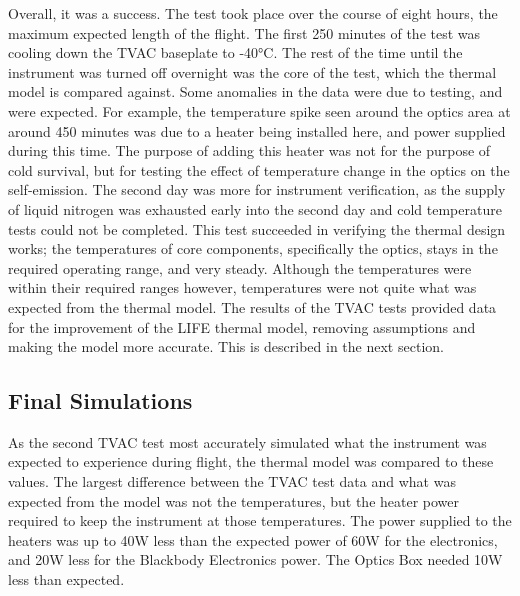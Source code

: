 Overall, it was a success. The test took place over the course of eight hours, the maximum expected length of the flight. The first 250 minutes of the test was cooling down the TVAC baseplate to -40°C. The rest of the time until the instrument was turned off overnight was the core of the test, which the thermal model is compared against. Some anomalies in the data were due to testing, and were expected. For example, the temperature spike seen around the optics area at around 450 minutes was due to a heater being installed here, and power supplied during this time. The purpose of adding this heater was not for the purpose of cold survival, but for testing the effect of temperature change in the optics on the self-emission. The second day was more for instrument verification, as the supply of liquid nitrogen was exhausted early into the second day and cold temperature tests could not be completed. This test succeeded in verifying the thermal design works; the temperatures of core components, specifically the optics, stays in the required operating range, and very steady. Although the temperatures were within their required ranges however, temperatures were not quite what was expected from the thermal model. The results of the TVAC tests provided data for the improvement of the LIFE thermal model, removing assumptions and making the model more accurate. This is described in the next section.

\subsection{Final Simulations}\label{final_pre_flight_sims}
As the second TVAC test most accurately simulated what the instrument was expected to experience during flight, the thermal model was compared to these values. The largest difference between the TVAC test data and what was expected from the model was not the temperatures, but the heater power required to keep the instrument at those temperatures. The power supplied to the heaters was up to 40W less than the expected power of 60W for the electronics, and 20W less for the Blackbody Electronics power. The Optics Box needed 10W less than expected.

